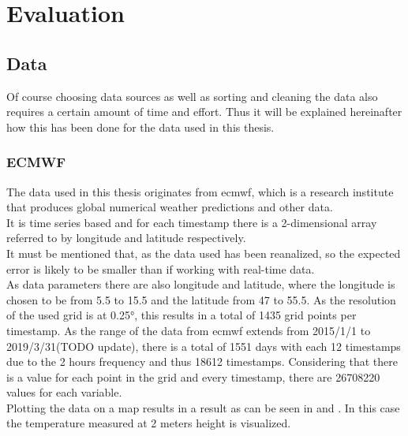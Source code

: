 \chapter{Evaluation}
\label{ch:Evaluation}

\section{Data}
\label{sec:data}

Of course choosing data sources as well as sorting and cleaning the data also requires a certain amount of time and effort. Thus it will be explained hereinafter how this has been done for the data used in this thesis.

\subsection{ECMWF}

The data used in this thesis originates from \acrshort{ecmwf}, which is a research institute that produces global numerical weather predictions and other data.\\
It is time series based and for each timestamp there is a 2-dimensional array referred to by longitude and latitude respectively.\\

It must be mentioned that, as the data used has been reanalized, so the expected error is likely to be smaller than if working with real-time data.\\

As data parameters there are also longitude and latitude, where the longitude is chosen to be from 5.5 to 15.5 and the latitude from 47 to 55.5. As the resolution of the used grid is at 0.25°, this results in a total of 1435 grid points per timestamp. As the range of the data from \acrshort{ecmwf} extends from 2015/1/1 to 2019/3/31(TODO update), there is a total of 1551 days with each 12 timestamps due to the 2 hours frequency and thus 18612 timestamps. Considering that there is a value for each point in the grid and every timestamp, there are 26708220 values for each variable.\\

Plotting the data on a map results in a result as can be seen in  and . In this case the temperature measured at 2 meters height is visualized.\\


